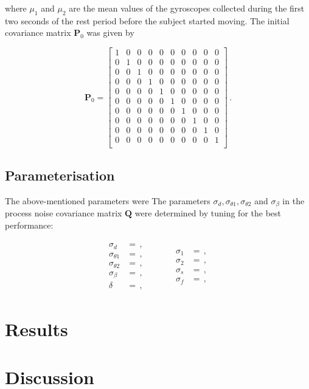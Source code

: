 \noindent
where $\mu_1$ and $\mu_2$ are the mean values of the gyroscopes collected during the first two seconds of the rest period before the subject started moving. The initial covariance matrix $\mathbf{P}_{0}$ was given by

\begin{equation}
\mathbf{P}_0 = \begin{bmatrix}
  1 & 0 & 0 & 0 & 0 & 0 & 0 & 0 & 0 & 0\\
  0 & 1 & 0 & 0 & 0 & 0 & 0 & 0 & 0 & 0\\
  0 & 0 & 1 & 0 & 0 & 0 & 0 & 0 & 0 & 0\\
  0 & 0 & 0 & 1 & 0 & 0 & 0 & 0 & 0 & 0\\
  0 & 0 & 0 & 0 & 1 & 0 & 0 & 0 & 0 & 0\\
  0 & 0 & 0 & 0 & 0 & 1 & 0 & 0 & 0 & 0\\
  0 & 0 & 0 & 0 & 0 & 0 & 1 & 0 & 0 & 0\\
  0 & 0 & 0 & 0 & 0 & 0 & 0 & 1 & 0 & 0\\
  0 & 0 & 0 & 0 & 0 & 0 & 0 & 0 & 1 & 0\\
  0 & 0 & 0 & 0 & 0 & 0 & 0 & 0 & 0 & 1\\
\end{bmatrix}\,.
\end{equation}

\subsection{Parameterisation}

The above-mentioned parameters were The parameters $\sigma_d, \sigma_{\theta 1}, \sigma_{\theta 2}$ and $\sigma_{\beta}$ in the process noise covariance matrix $\mathbf{Q}$ were determined by tuning for the best performance:

\begin{equation}
\begin{matrix}
	\begin{split}
	  \sigma_d &= \,, \\
	  \sigma_{\theta 1} &= \,, \\
	  \sigma_{\theta 2} &= \,, \\
	  \sigma_{\beta} &= \,, \\
	  \delta &= \,,
\end{split} \qquad \quad
    \begin{split}
	  \sigma_1 &= \,, \\
	  \sigma_2 &= \,, \\
	  \sigma_s &= \,, \\
	  \sigma_f &= \,,  
\end{split}
\end{matrix}
\end{equation}

\section{Results}

\section{Discussion}

